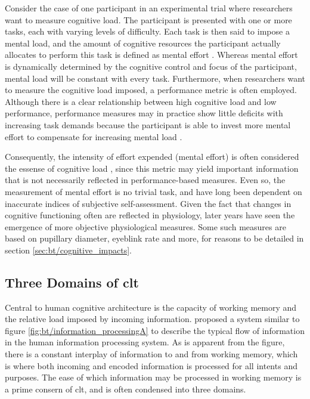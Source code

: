 Consider the case of one participant in an experimental trial where researchers want to measure cognitive load. The participant is presented with one or more tasks, each with varying levels of difficulty. Each task is then said to impose a mental load, and the amount of cognitive resources the participant actually allocates to perform this task is defined as mental effort \cite{paas1994}. Whereas mental effort is dynamically determined by the cognitive control and focus of the participant, mental load will be constant with every task. Furthermore, when researchers want to measure the cognitive load imposed, a performance metric is often employed. Although there is a clear relationship between high cognitive load and low performance, performance measures may in practice show little deficits with increasing task demands because the participant is able to invest more mental effort to compensate for increasing mental load \cite{tulga1980}.

Consequently, the intensity of effort expended (mental effort) is often considered the essense of cognitive load \cite{hamilton1979}, since this metric may yield important information that is not necessarily reflected in performance-based measures. Even so, the measurement of mental effort is no trivial task, and have long been dependent on inaccurate indices of subjective self-assessment. Given the fact that changes in cognitive functioning often are reflected in physiology, later years have seen the emergence of more objective physiological measures. Some such measures are based on pupillary diameter, eyeblink rate and more, for reasons to be detailed in section \ref{sec:bt/cognitive_impacts}.

\subsection{Three Domains of \acrlong{clt}}



Central to human cognitive architecture is the capacity of working memory and the relative load imposed by incoming information. \textcite{sweller1988} proposed a system similar to figure \ref{fig:bt/information_processingA} to describe the typical flow of information in the human information processing system. As is apparent from the figure, there is a constant interplay of information to and from working memory, which is where both incoming and encoded information is processed for all intents and purposes. The ease of which information may be processed in working memory is a prime consern of \acrshort{clt}, and is often condensed into three domains.

